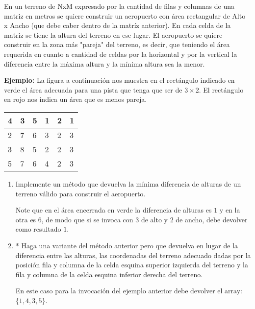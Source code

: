 En un terreno de NxM expresado por la cantidad de filas y columnas de una matriz en metros se quiere construir un aeropuerto con área rectangular de Alto x Ancho (que debe caber dentro de la matríz anterior). En cada celda de la matriz se tiene la altura del terreno en ese lugar. El aeropuerto se quiere construir en la zona más "pareja" del terreno, es decir, que teniendo el área requerida en cuanto a cantidad de celdas por la horizontal y por la vertical la diferencia entre la máxima altura y la mínima altura sea la menor.

\textbf{Ejemplo:} La figura a continuación nos muestra en el rectángulo indicado en verde el área adecuada para una pista que tenga que ser de \(3 \times 2\). El rectángulo en rojo nos indica un área que es menos pareja.

\begin{center}
    \begin{tabular}{|l|l|l|l|l|l|}
    \hline
    \cellcolor{blue!20} 4 & \cellcolor{blue!20} 3 & \cellcolor{blue!20} 5 & \cellcolor{blue!20} 1 & \cellcolor{blue!20} 2 & \cellcolor{blue!20} 1 \\
    \hline
    \cellcolor{red!20} 2 & \cellcolor{red!20} 7 & \cellcolor{blue!20} 6 & \cellcolor{blue!20} 3 & \cellcolor{green!20} 2 & \cellcolor{green!20} 3 \\
    \hline
    \cellcolor{red!20} 3 & \cellcolor{red!20} 8 & \cellcolor{blue!20} 5 & \cellcolor{blue!20} 2 & \cellcolor{green!20} 2 & \cellcolor{green!20} 3 \\
    \hline
    \cellcolor{red!20} 5 & \cellcolor{red!20} 7 & \cellcolor{blue!20} 6 & \cellcolor{blue!20} 4 & \cellcolor{green!20} 2 & \cellcolor{green!20} 3 \\
    \hline
    \end{tabular}
\end{center}

\begin{enumerate}[label=\alph*)]
    \item Implemente un método que devuelva la mínima diferencia de alturas de un terreno válido para construir el aeropuerto.
    
    Note que en el área encerrada en verde la diferencia de alturas es \(1\) y en la otra es \(6\), de modo que si se invoca con \(3\) de alto y \(2\) de ancho, debe devolver como resultado \(1.\)
    
    \item * Haga una variante del método anterior pero que devuelva en lugar de la diferencia entre las alturas, las coordenadas del terreno adecuado dadas por la posición fila y columna de la celda esquina superior izquierda del terreno y la fila y columna de la celda esquina inferior derecha del terreno. 
    
    En este caso para la invocación del ejemplo anterior debe devolver el array: \(\{1,4,3,5\}\).
\end{enumerate}